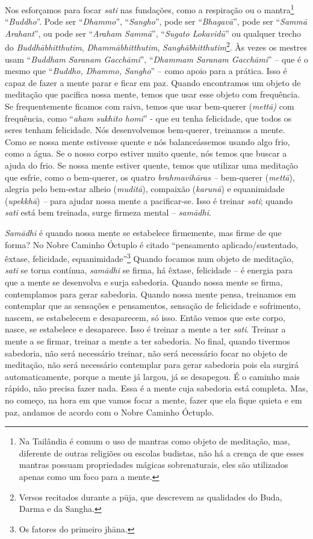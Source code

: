 Nos esforçamos para focar \textit{sati} nas fundações, como a
respiração ou o mantra\footnote{Na Tailândia é comum o uso de mantras
como objeto de meditação, mas, diferente de outras religiões ou escolas
budistas, não há a crença de que esses mantras possuam propriedades
mágicas sobrenaturais, eles são utilizados apenas como um foco para a
mente.} “\textit{Buddho}”. Pode ser “\textit{Dhammo}”,
“\textit{Sangho}”, pode ser “\textit{Bhagav\=a}”, pode ser
“\textit{Samm\=a Arahant}”, ou pode ser “\textit{Araham Samm\=a}”,
“\textit{Sugato Lokavid\=u}” ou qualquer trecho do
\textit{Buddh\=abhitthutim}, \textit{Dhamm\=abhitthutim},
\textit{Sangh\=abhitthutim}\footnote{Versos recitados durante a p\=uja,
que descrevem as qualidades do Buda, Darma e da Sangha.}. Às vezes os
mestres usam “\textit{Buddham Saranam Gacch\=ami}”, “\textit{Dhammam
Saranam Gacch\=ami}” – que é o mesmo que “\textit{Buddho, Dhammo,
Sangho}” – como apoio para a prática. Isso é capaz de fazer a mente
parar e ficar em paz. Quando encontramos um objeto de meditação que
pacifica nossa mente, temos que usar esse objeto com frequência. Se
frequentemente ficamos com raiva, temos que usar bem-querer
(\textit{mett\=a)} com frequência, como “\textit{aham sukhito homi}” -
que eu tenha felicidade, que todos os seres tenham felicidade. Nós
desenvolvemos bem-querer, treinamos a mente. Como se nossa mente
estivesse quente e nós balanceássemos usando algo frio, como a água. Se
o nosso corpo estiver muito quente, nós temos que buscar a ajuda do
frio. Se nossa mente estiver quente, temos que utilizar uma meditação
que esfrie, como o bem-querer, os quatro \textit{brahmavih\=aras –}
bem-querer (\textit{mett\=a}), alegria pelo bem-estar alheio
(\textit{mudit\=a}), compaixão (\textit{karun\=a}) e equanimidade
(\textit{upekkh\=a})\textit{ –} para ajudar nossa mente a pacificar-se.
Isso é treinar \textit{sati}; quando \textit{sati} está bem treinada,
surge firmeza mental – \textit{sam\=adhi}. 

\textit{Sam\=adhi} é quando nossa mente se estabelece firmemente,
mas firme de que forma? No Nobre Caminho Óctuplo é citado “pensamento
aplicado/sustentado, êxtase, felicidade, equanimidade”\footnote{Os
fatores do primeiro jh\=ana.} Quando focamos num objeto de meditação,
\textit{sati} se torna contínua, \textit{sam\=adhi} se firma, há
êxtase, felicidade – é energia para que a mente se desenvolva e surja
sabedoria. Quando nossa mente se firma, contemplamos para gerar
sabedoria. Quando nossa mente pensa, treinamos em contemplar que as
sensações e pensamentos, sensação de felicidade e sofrimento, nascem,
se estabelecem e desaparecem, só isso. Então vemos que este corpo,
nasce, se estabelece e desaparece. Isso é treinar a mente a ter
\textit{sati}. Treinar a mente a se firmar, treinar a mente a ter
sabedoria. No final, quando tivermos sabedoria, não será necessário
treinar, não será necessário focar no objeto de meditação, não será
necessário contemplar para gerar sabedoria pois ela surgirá
automaticamente, porque a mente já largou, já se desapegou. É o caminho
mais rápido, não precisa fazer nada. Essa é a mente cuja sabedoria está
completa. Mas, no começo, na hora em que vamos focar a mente, fazer que
ela fique quieta e em paz, andamos de acordo com o Nobre Caminho
Óctuplo. 

